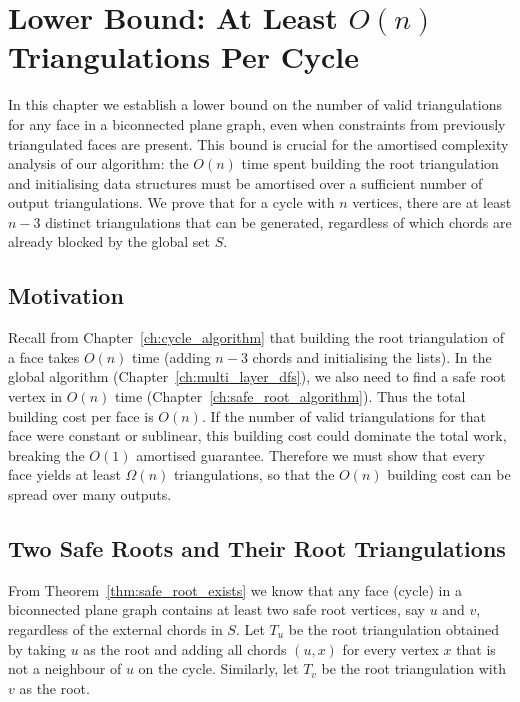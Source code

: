 
\chapter{Lower Bound: At Least \(O(n)\) Triangulations Per Cycle}
\label{ch:lower_bound}

In this chapter we establish a lower bound on the number of valid triangulations for any face in a biconnected plane graph, even when constraints from previously triangulated faces are present. 
This bound is crucial for the amortised complexity analysis of our algorithm: the \(O(n)\) time spent building the root triangulation and initialising data structures must be amortised over a sufficient number of output triangulations. 
We prove that for a cycle with \(n\) vertices, there are at least \(n-3\) distinct triangulations that can be generated, regardless of which chords are already blocked by the global set \(S\).

\section{Motivation}
\label{sec:lower_motivation}

Recall from Chapter~\ref{ch:cycle_algorithm} that building the root triangulation of a face takes \(O(n)\) time (adding \(n-3\) chords and initialising the lists). 
In the global algorithm (Chapter~\ref{ch:multi_layer_dfs}), we also need to find a safe root vertex in \(O(n)\) time (Chapter~\ref{ch:safe_root_algorithm}). 
Thus the total building cost per face is \(O(n)\). 
If the number of valid triangulations for that face were constant or sublinear, this building cost could dominate the total work, breaking the \(O(1)\) amortised guarantee. 
Therefore we must show that every face yields at least \(\Omega(n)\) triangulations, so that the \(O(n)\) building cost can be spread over many outputs.

\section{Two Safe Roots and Their Root Triangulations}
\label{sec:two_roots}

From Theorem~\ref{thm:safe_root_exists} we know that any face (cycle) in a biconnected plane graph contains at least two safe root vertices, say \(u\) and \(v\), regardless of the external chords in \(S\). 
Let \(T_u\) be the root triangulation obtained by taking \(u\) as the root and adding all chords \((u, x)\) for every vertex \(x\) that is not a neighbour of \(u\) on the cycle. 
Similarly, let \(T_v\) be the root triangulation with \(v\) as the root.

